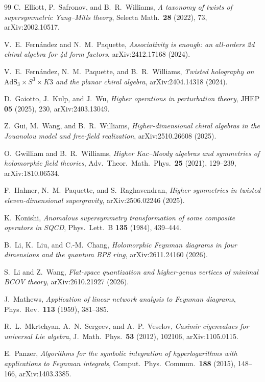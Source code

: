 \documentclass[11pt,a4paper]{article}
\theoremstyle{plain}
\theoremstyle{definition}
\theoremstyle{remark}
\numberwithin{equation}{section}
\numberwithin{figure}{section}
\numberwithin{table}{section}
\begin{document}
\begin{thebibliography}{99}
C.~Elliott, P.~Safronov, and B.~R.~Williams,
\emph{A taxonomy of twists of supersymmetric Yang--Mills theory},
Selecta Math.\ \textbf{28} (2022), 73, arXiv:2002.10517.

V.~E.~Fern\'andez and N.~M.~Paquette,
\emph{Associativity is enough: an all-orders 2d chiral algebra for 4d form factors},
arXiv:2412.17168 (2024).

V.~E.~Fern\'andez, N.~M.~Paquette, and B.~R.~Williams,
\emph{Twisted holography on $\mathrm{AdS}_3\times S^3\times K3$ and the planar chiral algebra},
arXiv:2404.14318 (2024).

D.~Gaiotto, J.~Kulp, and J.~Wu,
\emph{Higher operations in perturbation theory},
JHEP \textbf{05} (2025), 230, arXiv:2403.13049.

Z.~Gui, M.~Wang, and B.~R.~Williams,
\emph{Higher-dimensional chiral algebras in the Jouanolou model and free-field realization},
arXiv:2510.26608 (2025).

O.~Gwilliam and B.~R.~Williams,
\emph{Higher Kac--Moody algebras and symmetries of holomorphic field theories},
Adv.\ Theor.\ Math.\ Phys.\ \textbf{25} (2021), 129--239, arXiv:1810.06534.

F.~Hahner, N.~M.~Paquette, and S.~Raghavendran,
\emph{Higher symmetries in twisted eleven-dimensional supergravity},
arXiv:2506.02246 (2025).

K.~Konishi,
\emph{Anomalous supersymmetry transformation of some composite operators in SQCD},
Phys.\ Lett.\ B \textbf{135} (1984), 439--444.

B.~Li, K.~Liu, and C.-M.~Chang,
\emph{Holomorphic Feynman diagrams in four dimensions and the quantum BPS ring},
arXiv:2611.24160 (2026).

S.~Li and Z.~Wang,
\emph{Flat-space quantization and higher-genus vertices of minimal BCOV theory},
arXiv:2610.21927 (2026).

J.~Mathews,
\emph{Application of linear network analysis to Feynman diagrams},
Phys.\ Rev.\ \textbf{113} (1959), 381--385.

R.~L.~Mkrtchyan, A.~N.~Sergeev, and A.~P.~Veselov,
\emph{Casimir eigenvalues for universal Lie algebra},
J.\ Math.\ Phys.\ \textbf{53} (2012), 102106, arXiv:1105.0115.

E.~Panzer,
\emph{Algorithms for the symbolic integration of hyperlogarithms with applications to Feynman integrals},
Comput.\ Phys.\ Commun.\ \textbf{188} (2015), 148--166, arXiv:1403.3385.


\end{thebibliography}
\end{document}
